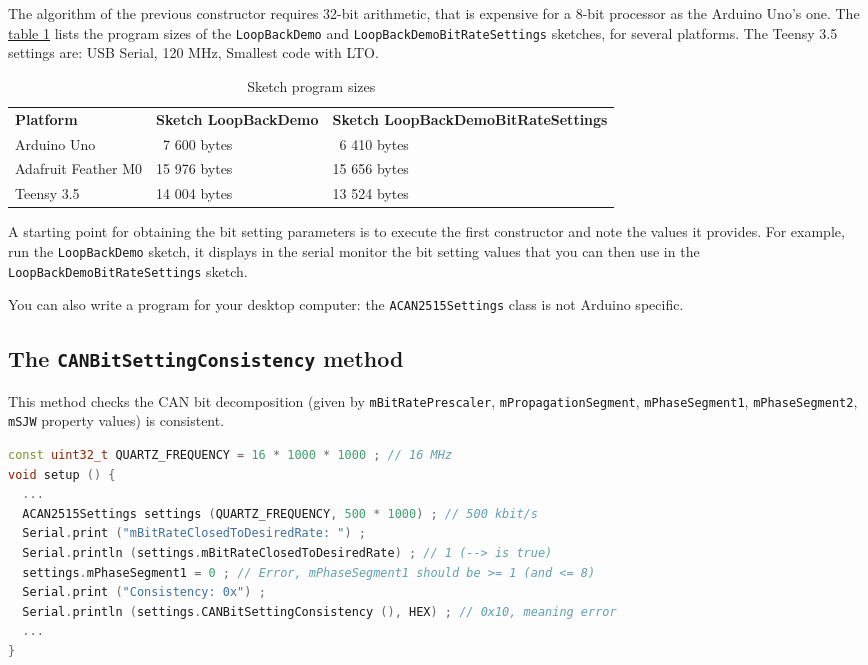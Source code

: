 \documentclass[10pt, a4paper, obeyspaces]{extarticle}
\newcommand \subsectionLabel[2]{\subsection{#1}\label{subsec:#2}}
\newcommand\labelTableau[1]{\label{tab:#1}}
\newcommand\refTableau[1]{\hyperref[tab:#1]{table \ref*{tab:#1}}}
\begin{document}
The algorithm of the previous constructor requires 32-bit arithmetic, that is expensive for a 8-bit processor as the Arduino Uno's one. The \refTableau{sketchSizes} lists the program sizes of the \texttt{LoopBackDemo} and \texttt{LoopBackDemoBitRateSettings} sketches, for several platforms. The Teensy 3.5 settings are: USB Serial, 120 MHz, Smallest code with LTO.

\begin{table}[!ht]
  \small
  \onehalfspacing
  \centering
  \begin{tabular}{lll}
    \textbf{Platform} & \textbf{Sketch LoopBackDemo} & \textbf{Sketch LoopBackDemoBitRateSettings}\\
    Arduino Uno & ~7 600 bytes & ~6 410 bytes\\
    Adafruit Feather M0 & 15 976 bytes & 15 656 bytes\\
    Teensy 3.5 & 14 004 bytes & 13 524 bytes\\
  \end{tabular}
  \caption{Sketch program sizes}
  \labelTableau{sketchSizes}
\end{table}

A starting point for obtaining the bit setting parameters is to execute the first constructor and note the values it provides. For example, run the \texttt{LoopBackDemo} sketch, it displays in the serial monitor the bit setting values that you can then use in the \texttt{LoopBackDemoBitRateSettings} sketch.

You can also write a program for your desktop computer: the \texttt{ACAN2515Settings} class is not Arduino specific.





\subsectionLabel{The \texttt{CANBitSettingConsistency} method}{CANBitSettingConsistency}

This method checks the CAN bit decomposition (given by \texttt{mBitRatePrescaler}, \texttt{mPropagationSegment}, \texttt{mPhaseSegment1}, \texttt{mPhaseSegment2}, \texttt{mSJW} property values) is consistent.

{ \small\begin{lstlisting}[language=c++]
const uint32_t QUARTZ_FREQUENCY = 16 * 1000 * 1000 ; // 16 MHz
void setup () {
  ...
  ACAN2515Settings settings (QUARTZ_FREQUENCY, 500 * 1000) ; // 500 kbit/s
  Serial.print ("mBitRateClosedToDesiredRate: ") ;
  Serial.println (settings.mBitRateClosedToDesiredRate) ; // 1 (--> is true)
  settings.mPhaseSegment1 = 0 ; // Error, mPhaseSegment1 should be >= 1 (and <= 8)
  Serial.print ("Consistency: 0x") ;
  Serial.println (settings.CANBitSettingConsistency (), HEX) ; // 0x10, meaning error
  ...
}
\end{lstlisting}}
\end{document}
